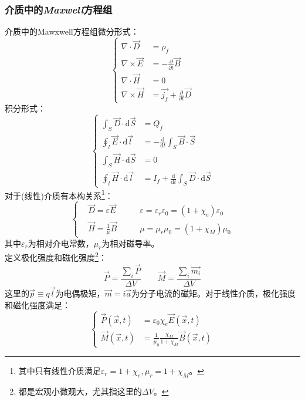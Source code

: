 \documentclass[12pt]{article}
\begin{document}
\subsubsection{介质中的\textit{Maxwell}方程组}
介质中的Mawxwell方程组微分形式：
\begin{equation}
    \left\{
    \begin{split}
        \nabla\cdot\Vec{D}&=\rho_f\\
        \nabla\times\Vec{E}&=-\frac{\partial}{\partial t}\Vec{B}\\
        \nabla\cdot\Vec{H}&=0\\
        \nabla\times\Vec{H}&=\Vec{j_f}+\frac{\partial}{\partial t}\Vec{D}
    \end{split}\right.
    \label{x7}
\end{equation}
积分形式：
\begin{equation}\left\{
    \begin{split}
        \int_S \Vec{D}\cdot\mathrm{d}\Vec{S}&=Q_f\\
        \oint_l \Vec{E}\cdot\mathrm{d}\Vec{l}&=-\frac{\mathrm{d}}{\mathrm{d}t}\int_S \Vec{B}\cdot\Vec{S}\\
        \int_S \Vec{H}\cdot\mathrm{d}\Vec{S}&=0\\
        \oint_l \Vec{H}\cdot\mathrm{d}\Vec{l}&=I_f+\frac{\mathrm{d}}{\mathrm{d}t}\int_S \Vec{D}\cdot\mathrm{d}\Vec{S}
    \end{split}\right.
    \label{x6}
\end{equation}
对于(线性)介质有本构关系\footnote{其中只有线性介质满足$\varepsilon_r=1+\chi_e, \mu_r=1+\chi_M$。}：
\begin{equation}
    \left\{\begin{split}
&\Vec{D}=\varepsilon\Vec{E}\quad\quad&\varepsilon=\varepsilon_r\varepsilon_0=(1+\chi_e)\varepsilon_0\\
&\Vec{H}=\frac{1}{\mu}\Vec{B}\quad\quad&\mu=\mu_r\mu_0=(1+\chi_M)\mu_0
    \end{split}\right.
\end{equation}
其中$\varepsilon_r$为相对介电常数，$\mu_r$为相对磁导率。\\
定义极化强度和磁化强度\footnote{都是宏观小微观大，尤其指这里的$\Delta V$。}：
\begin{equation}
    \Vec{P}=\frac{\sum_i \Vec{P}}{\Delta V}\quad\quad\Vec{M}=\frac{\sum_i \Vec{m_i}}{\Delta V}
\end{equation}
这里的$\Vec{p}\equiv q\Vec{l}$为电偶极矩，$\Vec{m}=i\Vec{a}$为分子电流的磁矩。对于线性介质，极化强度和磁化强度满足：
\begin{equation}
    \left\{\begin{split}
        \Vec{P}(\Vec{x},t)&=\varepsilon_0\chi_e\Vec{E}(\Vec{x},t)\\
        \Vec{M}(\Vec{x},t)&=\frac{1}{\mu_0}\frac{\chi_M}{1+\chi_M}\Vec{B}(\Vec{x},t)
    \end{split}\right.
\end{equation}
\end{document}
